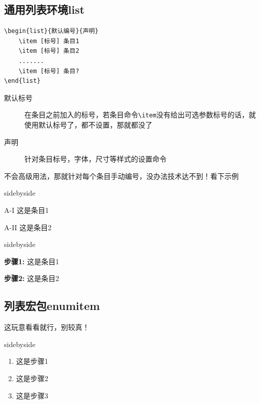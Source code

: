 \documentclass[cn,chinese,color=cyan]{elegantbook}
\begin{document}
\subsection{通用列表环境list}
\begin{lstlisting}[style=R]
\begin{list}{默认编号}{声明}
	\item [标号] 条目1  
	\item [标号] 条目2
	.......
	\item [标号] 条目?
\end{list}
\end{lstlisting}

\begin{description}
	\item[默认标号] 在条目之前加入的标号，若条目命令\verb|\item|没有给出可选参数标号的话，就使用默认标号了，都不设置，那就都没了
	\item[声明] 针对条目标号，字体，尺寸等样式的设置命令
\end{description}
\begin{note}
	不会高级用法，那就针对每个条目手动编号，没办法技术达不到！看下示例
\end{note}

\begin{tcblisting}{sidebyside}
\begin{list}{}{}
\item [A-I] 这是条目1
\item [A-II] 这是条目2
\end{list}
\end{tcblisting}
\begin{tcblisting}{sidebyside}
\begin{list}{}{}
\item [{\bfseries 步骤1:}] 这是条目1
\item [{\bfseries 步骤2:}] 这是条目2
\end{list}
\end{tcblisting}

\subsection{列表宏包enumitem}
这玩意看看就行，别较真！
\begin{tcblisting}{sidebyside}
\begin{enumerate}[label=\fcolorbox{blue!30}
{cyan!40}{\ding{\value*}},start=172
,itemsep=0pt]
\item 这是步骤1
\item 这是步骤2
\item 这是步骤3
\end{enumerate}
\end{tcblisting}
\end{document}
